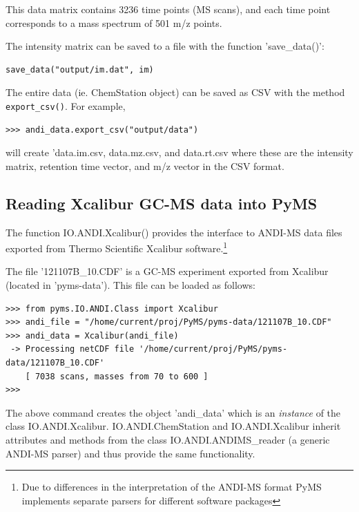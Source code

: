 \noindent
This data matrix contains 3236 time points (MS scans), and each time point
corresponds to a mass spectrum of 501 m/z points.

The intensity matrix can be saved to a file with the function 'save\_data()':

\begin{verbatim}
save_data("output/im.dat", im)
\end{verbatim}

The entire data (ie. ChemStation object) can be saved as CSV with the method
{\tt export\_csv()}. For example,

\begin{verbatim}
>>> andi_data.export_csv("output/data")
\end{verbatim}

\noindent
will create 'data.im.csv, data.mz.csv, and data.rt.csv where these are the
intensity matrix, retention time vector, and m/z vector in the CSV format.

\subsection{Reading Xcalibur GC-MS data into PyMS}


The function IO.ANDI.Xcalibur() provides the interface to ANDI-MS data files
exported from Thermo Scientific Xcalibur software.\footnote{Due to differences
in the interpretation of the ANDI-MS format PyMS implements separate parsers
for different software packages}

The file '121107B\_10.CDF' is a GC-MS experiment exported from Xcalibur (located
in 'pyms-data'). This file can be loaded as follows:

\begin{verbatim}
>>> from pyms.IO.ANDI.Class import Xcalibur
>>> andi_file = "/home/current/proj/PyMS/pyms-data/121107B_10.CDF"
>>> andi_data = Xcalibur(andi_file)
 -> Processing netCDF file '/home/current/proj/PyMS/pyms-data/121107B_10.CDF'
    [ 7038 scans, masses from 70 to 600 ]
>>>
\end{verbatim}

\noindent
The above command creates the object 'andi\_data' which is an {\em instance}
of the class IO.ANDI.Xcalibur. IO.ANDI.ChemStation and IO.ANDI.Xcalibur 
inherit attributes and methods from the class IO.ANDI.ANDIMS\_reader
(a generic ANDI-MS parser) and thus provide the same functionality.


